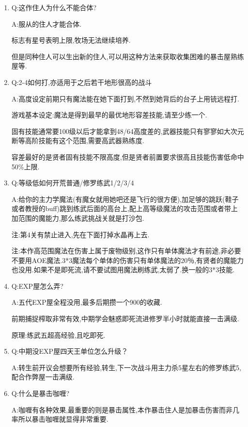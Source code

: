 \begin{enumerate}

	\item
	Q:这作住人为什么不能合体?

	A:服从的住人才能合体.

	标志有星号表明上限,牧场无法继续培养.

	但是同种住人可以生出新的住人,可以用这种方法来获取收集困难的暴击屋熟练屋等.

	\item
	Q:2-4如何打,亦适用于之后若干地形很高的战斗

	A:高度设定前期只有魔法能在她下面打到,不然到她背后的台子上用铳远程打.

	游戏基本设定:魔法是得到最早的最优地形容差技能,请至少练一个.

	固有技能通常要100级以后才能拿到48/64高度差的,武器技能只有寥寥如大次元断等高阶技能有这个范围,需要高武器熟练度.

	容差最好的是贤者固有技能不限高度,但是贤者前置要求很高且技能伤害低命中50\%上限.

	\item
	Q:等级低如何开荒普通/修罗练武1/2/3/4

	A:给你的主力学魔法(有魔女就用她吧还是飞行的很方便),加足够的跳跃(鞋子或者教授的buff)跳到练武后面的高台上,配上高等级魔法的攻击范围或者带上加范围的魔能力,那么练武挑战关就是打沙包.

	注:第4关有禁止进入,先在下面打掉水晶再上去.

	注:本作高范围魔法在伤害上属于废物级别,这作只有单体魔法才有前途,非必要不要用AOE魔法.3*3魔法每个单体的伤害只有单体魔法的20％,有贤者的魔能力也没用.如果不是即死流,请不要试图用魔法刷练武,太弱了.换一般的3*3技能.

	\item
	Q:EXP屋怎么弄?

	A:五代EXP屋全程没用,最多后期攒一个900的收藏.

	前期捕捉榨取非常有效,中期学会魅惑即死流进修罗半小时就能直接一击满级.

	原理:练武五超高经验,且吃即死.

	\item
	Q:中期没EXP屋四天王单位怎么升级？

	A:转生前开议会想要所有经验,转生,下一次战斗用主力杀5星左右的修罗练武5,配合作弊屋一击满级.

	\item
	Q:什么是暴击咖喱?
	
	A:咖喱有各种效果,最重要的则是暴击属性,本作暴击住人是加暴击伤害而非几率所以暴击咖喱就显得非常重要.


\end{enumerate}
